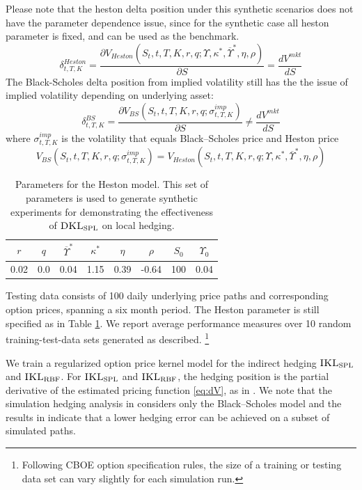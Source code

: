 \documentclass[letterpaper,12pt,titlepage,oneside,final]{book}
\numberwithin{equation}{section}
\theoremstyle{definition}
\newcommand{\Vmkt}{V^{mkt}}
\newcommand{\DKLs}{\bf\textsc{DKL}_{\text{SPL}}}
\newcommand{\IKLs}{\bf\textsc{IKL}_{\text{SPL}}}
\newcommand{\IKLg}{\bf\textsc{IKL}_{\text{RBF}}}
\begin{document}
 Please note that the heston delta position under this synthetic scenarios does not have the parameter dependence issue, since for the synthetic case all heston parameter is fixed, and can be used as the benchmark.
 \[
	 \delta^{Heston}_{t,T,K}=\frac{ \partial V_{Heston}(S_t,t,T,K,r,q;\Upsilon,\kappa^*,\overline{\Upsilon}^*,\eta,\rho)}{\partial S}=\frac{d \Vmkt}{d S}
 \] 
 The Black-Scholes delta position from implied volatility still has the the issue of implied volatility depending on underlying asset:
 \[
	 \delta^{BS}_{t,T,K}=\frac{ \partial V_{BS}(S_t,t,T,K,r,q;\sigma^{imp}_{t,T,K})}{\partial S} \neq \frac{d \Vmkt}{d S}
 \] 
 where $\sigma^{imp}_{t,T,K}$ is the volatility that equals Black–Scholes price and Heston price
 \[
	 V_{BS}(S_t,t,T,K,r,q;\sigma^{imp}_{t,T,K})=V_{Heston}(S_t,t,T,K,r,q;\Upsilon,\kappa^*,\overline{\Upsilon}^*,\eta,\rho)
 \]

 \begin{table}[htp!]
\begin{center}
\begin{tabular}{|c|c|c|c|c|c|c|c|}
\hline
 $r$ &$q$& $\overline{\Upsilon}^*$  & $\kappa^*$ & $\eta$ & $\rho$ & $S_0$ & $\Upsilon_0$  \\ \hline
 0.02&0.0&0.04                  & 1.15   & 0.39  & -0.64 & 100 &0.04 \\    \hline
\end{tabular}
\end{center}

\caption{Parameters for the Heston model. This set of parameters is used to generate synthetic experiments for demonstrating the effectiveness of $\DKLs$ on local hedging.}
\label{para}
\end{table}



Testing data consists of 100 daily underlying price paths and corresponding option prices, spanning a six month period. The Heston parameter is still specified as in Table \ref{para}. We report average performance measures over 10 random training-test-data sets generated as described. \footnote{Following CBOE option specification rules, the size of a training or testing data set can vary slightly for each simulation run.}



We train a regularized option price kernel model for the indirect hedging $\IKLs$ and $\IKLg$. For $\IKLs$ and $\IKLg$,
the hedging position is  the partial derivative of the estimated pricing function  \eqref{eq:dV},  as in \citep{hutchinson}. We note that the simulation hedging analysis in \cite{hutchinson} considers only the Black–Scholes model and the results in \citep{hutchinson} indicate that a lower hedging error can be achieved on a subset of simulated paths.
\end{document}
